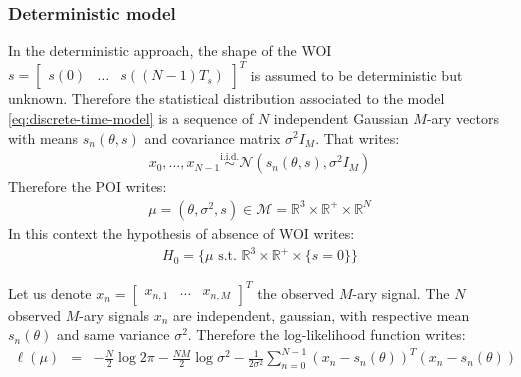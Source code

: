 \documentclass[graybox]{svmult/styles/svmult}
\def\simiid{\stackrel{\mathrm{i.i.d.}}{\sim}}
\begin{document}
 \subsubsection{Deterministic model}
 In the deterministic approach, the shape of the WOI $s=\begin{bmatrix} s(0)&\ldots&  s((N-1)T_{s}) \end{bmatrix}^{T}$  is assumed to be deterministic but unknown. Therefore the statistical distribution associated to the model \eqref{eq:discrete-time-model} is a sequence of $N$ independent Gaussian $M$-ary vectors with means $s_{n}(\theta,s)$ and covariance matrix $\sigma^{2}I_{M}$. That writes:
 \begin{eqnarray}
\label{eq:determinsitic-time-model}
x_{0},\ldots,x_{N-1} \simiid \mathcal{N}(s_{n}(\theta,s),\sigma^{2}I_{M})
\end{eqnarray}
Therefore the POI writes:
 \begin{eqnarray}
  \label{eq:poideterministic}
  \mu=(\theta,\sigma^{2},s)\in\mathcal{M}=\mathds{R}^{3}\times \mathds{R}^{+}\times \mathds{R}^{N}
\end{eqnarray} 
In this context the hypothesis of absence of WOI writes:
 \begin{eqnarray}
 \label{eq:H0}
 H_{0}=\{\mu \,\,\mathrm{s.t.}\,\,\mathds{R}^{3}\times \mathds{R}^{+}\times \{s=0\}\} 
 \end{eqnarray}


Let us denote  $x_{n}=\begin{bmatrix}x_{n,1}&\ldots&x_{n,M}\end{bmatrix}^{T}$ the observed $M$-ary signal. The $N$ observed  $M$-ary signals $x_{n}$ are independent, gaussian, with respective mean $s_{n}(\theta)$ and same variance $\sigma^{2}$.
Therefore the log-likelihood function writes:
 \begin{eqnarray}
 \label{eq:loglikelihood-determinstic}
 \ell(\mu)&=&-\frac{N}{2}\log 2\pi-\frac{NM}{2}\log\sigma^{2}
 -
 \frac{1}{2\sigma^{2}}\sum_{n=0}^{N-1}(x_{n}-s_{n}(\theta))^{T}(x_{n}-s_{n}(\theta))
 \end{eqnarray}

\end{document}
